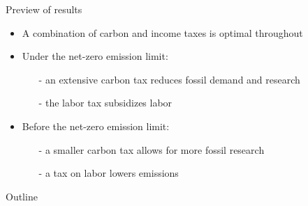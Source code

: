 \documentclass[11pt,aspectratio=169]{beamer}
\begin{document}
\begin{frame}{Preview of results}
	\vspace{-3mm}
	\pause
	\begin{itemize}[<+-| alert@+>]
		\item A combination of carbon and income taxes is optimal throughout
		\vspace{2mm}
		\item \normalsize{Under the net-zero emission limit:}
		\vspace{1mm}
		\begin{itemize}
			\item[-]  \normalsize{an extensive carbon tax reduces fossil demand and research}
			\vspace{1mm}
			\item[-] \normalsize{the labor tax subsidizes labor}
		\end{itemize}
		\vspace{2mm}
		\item \normalsize{Before the net-zero emission limit:}
		\vspace{1mm}
		\begin{itemize}
			\item[-] \normalsize{a smaller carbon tax allows for more fossil research}
			\vspace{1mm}
			\item[-] \normalsize{a tax on labor lowers emissions}
		\end{itemize}	
\end{itemize}
\end{frame}

%
\begin{frame}{Outline}
\tableofcontents
\end{frame}
\end{document}
